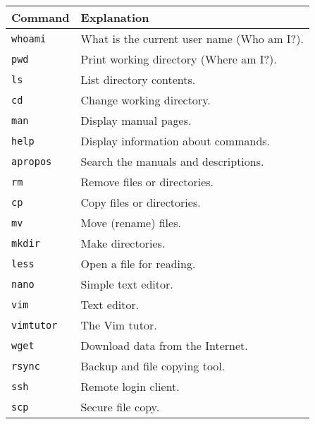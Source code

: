 \begin{center}
\begin{longtable} { l l }
\hline
Command & Explanation \\
\hline\hline
    \verb|whoami| & What is the current user name (Who am I?).\\
    \verb|pwd|    & Print working directory (Where am I?). \\
    \verb|ls|     & List directory contents. \\
    \verb|cd|     & Change working directory. \\
    \hline
    \verb|man|    & Display manual pages. \\
    \verb|help|   & Display information about commands. \\
    \verb|apropos| & Search the manuals and descriptions. \\
    \hline
    \verb|rm|     & Remove files or directories. \\
    \verb|cp|     & Copy files or directories. \\
    \verb|mv|     & Move (rename) files. \\
    \verb|mkdir|  & Make directories. \\
    \hline
    \verb|less|   & Open a file for reading. \\
    \verb|nano|   & Simple text editor. \\
    \verb|vim|     & Text editor. \\
    \verb|vimtutor| & The Vim tutor. \\
    \hline
    \verb|wget| & Download data from the Internet. \\
    \verb|rsync| & Backup and file copying tool. \\
    \verb|ssh| & Remote login client. \\
    \verb|scp| & Secure file copy. \\
\hline
\end{longtable}
\end{center}
